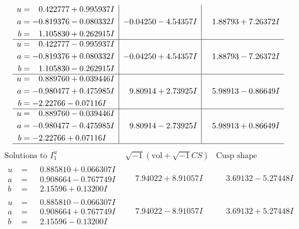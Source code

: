 \documentclass[1p]{elsarticle_modified}
\theoremstyle{definition}
\newcommand{\I}{\sqrt{-1}}
\begin{document}
$$\begin{array}{c|c|c}
\begin{aligned}
u &= \phantom{-}0.422777 + 0.995937 I \\
a &= -0.819376 - 0.080332 I \\
b &= \phantom{-}1.105830 + 0.262915 I\end{aligned}
 & -0.04250 - 4.54357 I & \phantom{-}1.88793 + 7.26372 I \\ \hline\begin{aligned}
u &= \phantom{-}0.422777 - 0.995937 I \\
a &= -0.819376 + 0.080332 I \\
b &= \phantom{-}1.105830 - 0.262915 I\end{aligned}
 & -0.04250 + 4.54357 I & \phantom{-}1.88793 - 7.26372 I \\ \hline\begin{aligned}
u &= \phantom{-}0.889760 + 0.039446 I \\
a &= -0.980477 + 0.475985 I \\
b &= -2.22766 - 0.07116 I\end{aligned}
 & \phantom{-}9.80914 + 2.73925 I & \phantom{-}5.98913 - 0.86649 I \\ \hline\begin{aligned}
u &= \phantom{-}0.889760 - 0.039446 I \\
a &= -0.980477 - 0.475985 I \\
b &= -2.22766 + 0.07116 I\end{aligned}
 & \phantom{-}9.80914 - 2.73925 I & \phantom{-}5.98913 + 0.86649 I\\
 \hline 
 \end{array}$$\newpage$$\begin{array}{c|c|c}  
\text{Solutions to }I^u_{1}& \I (\text{vol} + \sqrt{-1}CS) & \text{Cusp shape}\\
 \hline 
\begin{aligned}
u &= \phantom{-}0.885810 + 0.066307 I \\
a &= \phantom{-}0.908664 - 0.767749 I \\
b &= \phantom{-}2.15596 + 0.13200 I\end{aligned}
 & \phantom{-}7.94022 + 8.91057 I & \phantom{-}3.69132 - 5.27448 I \\ \hline\begin{aligned}
u &= \phantom{-}0.885810 - 0.066307 I \\
a &= \phantom{-}0.908664 + 0.767749 I \\
b &= \phantom{-}2.15596 - 0.13200 I\end{aligned}
 & \phantom{-}7.94022 - 8.91057 I & \phantom{-}3.69132 + 5.27448 I \\ \hline\begin{aligned}

\end{aligned}
\end{array}$$
\end{document}
